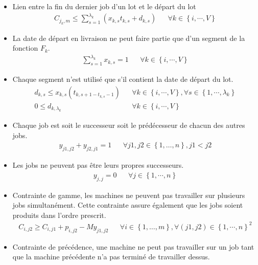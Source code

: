 \begin{itemize}
	\item
	      Lien entre la fin du dernier job d'un lot et le départ du lot
	      \begin{align}
		      C_{j_k, m} \leq \sum_{s=1}^{\lambda_k} \left( x_{k,s} t_{k, s} + d_{k, s} \right) &  & \forall k \in \left\{i, \cdots, V \right\}
	      \end{align}
	\item
	      La date de départ en livraison ne peut faire partie que d'un segment de la fonction $F_k$.
	      \begin{align}
		      \sum_{s=1}^{\lambda_k} x_{k, s} = 1 &  & \forall k \in \left\{i, \cdots, V \right\}
	      \end{align}
	\item
	      Chaque segment n'est utilisé que s'il contient la date de départ du lot.
	      \begin{align}
		      d_{k, s} \leq x_{k, s} \left( t_{k, s+1 - t_{k, s} -1} \right) &  & \forall k \in \left\{i, \cdots, V \right\}, \forall s \in \left\{1, \cdots, \lambda_k\right\} \\
		      0 \leq d_{k, \lambda_k}                                        &  & \forall k \in \left\{i, \cdots, V \right\}
		  \end{align}
	\item
	      Chaque job est soit le successeur soit le prédécesseur de chacun des autres jobs.
	      \begin{align}
		      y_{j1,j2}+y_{j2,j1}=1 &  &
		      \forall j1,j2\in\left\{1,\dotsc,n\right\}, j1<j2
	      \end{align}
	\item
	      Les jobs ne peuvent pas être leurs propres successeurs.
	      \begin{align}
		      y_{j,j}=0 &  &
		      \forall j\in \left\{1,\cdots, n\right\}
	      \end{align}
	\item
	      Contrainte de gamme, les machines ne peuvent pas travailler sur plusieurs jobs simultanément.
	      Cette contrainte assure également que les jobs soient produits dans l'ordre prescrit.
	      \begin{align}
		      C_{i,j2} \geq C_{i,j1}+p_{i,j2}-M y_{j1,j2} &  &
		      \forall i\in\left\{1,\dotsc,m\right\}, \forall\left(j1,j2\right)\in\left\{1,\cdots,n\right\}^2
	      \end{align}
	\item
	      Contrainte de précédence, une machine ne peut pas travailler sur un job tant que la machine précédente n’a pas terminé de travailler dessus.

\end{itemize}
